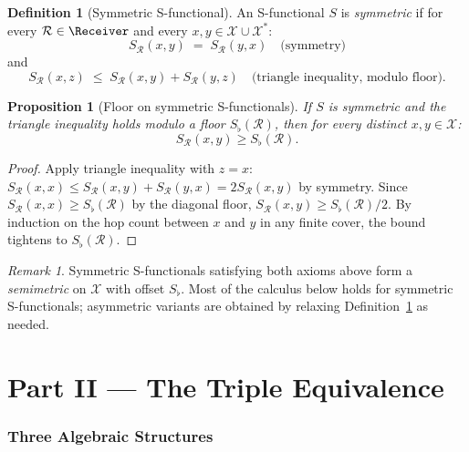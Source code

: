 \documentclass[twocolumn,11pt,a4paper]{article}
\theoremstyle{thmstyle}
\newtheorem{proposition}[theorem]{Proposition}
\theoremstyle{thmstyle}
\theoremstyle{definition}
\newtheorem{definition}[theorem]{Definition}
\theoremstyle{remark}
\newtheorem{remark}[theorem]{Remark}
\newcommand{\Cands}{\mathcal{X}}
\newcommand{\Truth}{\mathcal{X}^{*}}
\newcommand{\receiver}{\mathcal{R}}
\newcommand{\Sscalar}{S}
\newcommand{\Sfloor}{S_{\flat}}
\begin{document}
\begin{definition}[Symmetric S-functional]\label{def:symmetric-S}
An S-functional $\Sscalar$ is \emph{symmetric} if for every
$\receiver \in \Receiver$ and every
$x, y \in \Cands \cup \Truth$:
\[
\Sscalar_{\receiver}(x, y)
\;=\; \Sscalar_{\receiver}(y, x)
\quad \text{(symmetry)}
\]
and
\[
\Sscalar_{\receiver}(x, z)
\;\leq\; \Sscalar_{\receiver}(x, y)
       + \Sscalar_{\receiver}(y, z)
\quad \text{(triangle inequality, modulo floor)}.
\]
\end{definition}

\begin{proposition}[Floor on symmetric S-functionals]
\label{prop:sym-floor}
If $\Sscalar$ is symmetric and the triangle inequality
holds modulo a floor $\Sfloor(\receiver)$, then for every
distinct $x, y \in \Cands$:
\[
\Sscalar_{\receiver}(x, y) \geq \Sfloor(\receiver).
\]
\end{proposition}

\begin{proof}
Apply triangle inequality with $z = x$:
$\Sscalar_{\receiver}(x, x)
\leq \Sscalar_{\receiver}(x, y) + \Sscalar_{\receiver}(y, x)
= 2\Sscalar_{\receiver}(x, y)$ by symmetry.  Since
$\Sscalar_{\receiver}(x, x) \geq \Sfloor(\receiver)$
by the diagonal floor, $\Sscalar_{\receiver}(x, y)
\geq \Sfloor(\receiver)/2$.  By induction on the
hop count between $x$ and $y$ in any finite cover, the
bound tightens to $\Sfloor(\receiver)$.
\end{proof}

\begin{remark}\label{rem:semimetric}
Symmetric S-functionals satisfying both axioms above form
a \emph{semimetric} on $\Cands$ with offset $\Sfloor$.
Most of the calculus below holds for symmetric S-functionals;
asymmetric variants are obtained by relaxing
Definition~\ref{def:symmetric-S} as needed.
\end{remark}



\part*{Part II --- The Triple Equivalence}

\section{Three Algebraic Structures}
\label{sec:three-structures}
\end{document}
